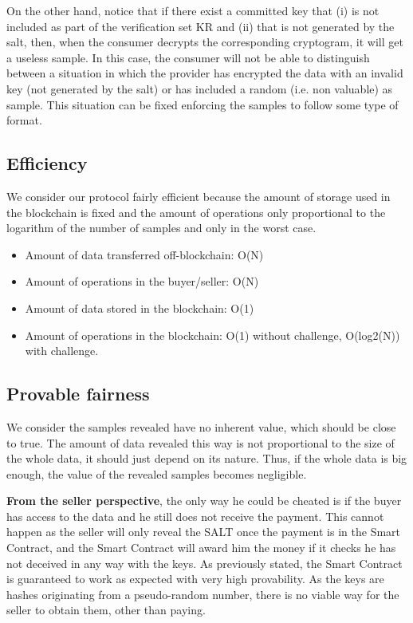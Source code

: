 \documentclass[]{article}
\begin{document}
	On the other hand, notice that if there exist a committed key that (i) is not included as part of the verification set KR and (ii) that is not generated by the salt, then, when the consumer decrypts the corresponding cryptogram, it will get a useless sample. In this case, the consumer will not be able to distinguish between a situation in which the provider has encrypted the data with an invalid key (not generated by the salt) or has included a random (i.e.  non valuable) as sample. This situation can be fixed enforcing the samples to follow some type of format.

	\subsection {Efficiency}
	We consider our protocol fairly efficient because the amount of storage used in the blockchain is fixed and the amount of operations only proportional to the logarithm of the number of samples and only in the worst case.
	\begin{itemize}
		\item Amount of data transferred off-blockchain: O(N)
		\item Amount of operations in the buyer/seller: O(N)
		\item Amount of data stored in the blockchain: O(1)
		\item Amount of operations in the blockchain: O(1) without challenge, O(log2(N)) with challenge.
	\end{itemize}
	
	\subsection{Provable fairness}
	We consider the samples revealed have no inherent value, which should be close to true. The amount of data revealed this way is not proportional to the size of the whole data, it should just depend on its nature. Thus, if the whole data is big enough, the value of the revealed samples becomes negligible.
	
	\textbf{From the seller perspective}, the only way he could be cheated is if the buyer has access to the data and he still does not receive the payment. This cannot happen as the seller will only reveal the SALT once the payment is in the Smart Contract, and the Smart Contract will award him the money if it checks he has not deceived in any way with the keys. As previously stated, the Smart Contract is guaranteed to work as expected with very high provability. As the keys are hashes originating from a pseudo-random number, there is no viable way for the seller to obtain them, other than paying.
\end{document}
